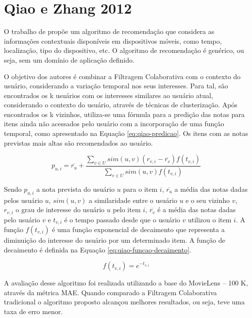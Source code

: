 \section{Qiao e Zhang 2012}

O trabalho de  propõe um algoritmo de recomendação que considera as informações
contextuais disponíveis em dispositivos móveis, como tempo, localização, tipo do dispositivo, etc. O algoritmo de
recomendação é genérico, ou seja, sem um domínio de aplicação definido.

O objetivo dos autores é combinar a Filtragem Colaborativa com o contexto do usuário, considerando a variação temporal
nos seus interesses. Para tal, são encontrados os k usuários com os interesses similares ao usuário atual,
considerando o contexto do usuário, através de técnicas de clusterização. Após encontrados os k vizinhos, utiliza-se
uma fórmula para a predição das notas para itens ainda não acessados pelo usuário com a incorporação de uma função
temporal, como apresentado na Equação \ref{eq:qiao-predicao}. Os itens com as notas previstas mais altas são
recomendados ao usuário.

\begin{equation}
  \label{eq:qiao-predicao}
  p_{u,i} = \overline{r_u} + \frac{\sum_{v \in U}{sim(u, v)(r_{v,i} - \overline{r_v})f(t_{v,i})}}{\sum_{v \in U}{sim(u, v)f(t_{v,i})}}
\end{equation}

Sendo $p_{u,i}$ a nota prevista do usuário $u$ para o item $i$, $\overline{r_u}$ a média das notas dadas pelos usuário
$u$, $sim(u, v)$ a similaridade entre o usuário $u$ e o seu vizinho $v$, $r_{v,i}$ o grau de interesse do usuário $u$
pelo item $i$, $\overline{r_v}$ é a média das notas dadas pelo usuário $v$ e $t_{v,i}$ é o tempo passado desde que o
usuário $v$ utilizou o item $i$. A função $f(t_{v,i})$ é uma função exponencial de decaimento que representa a diminuição do
interesse do usuário por um determinado item. A função de decaimento é definida na Equação \ref{eq:qiao-funcao-decaimento}.

\begin{equation}
  \label{eq:qiao-funcao-decaimento}
  f(t_{v,i}) = e^{-t_{v,i}}
\end{equation}

A avaliação desse algoritmo foi realizada utilizando a base do MovieLens – 100 K, através da métrica MAE. Quando
comparado a Filtragem Colaborativa tradicional o algoritmo proposto alcançou melhores resultados, ou seja, teve uma taxa de erro menor.

